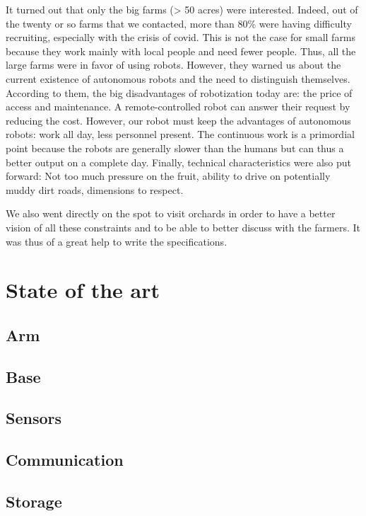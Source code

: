\documentclass[oneside]{book}
\begin{document}
It turned out that only the big farms (> 50 acres) were interested. Indeed, out of the twenty or so farms that we contacted, more than 80\% were having difficulty recruiting, especially with the crisis of covid. This is not the case for small farms because they work mainly with local people and need fewer people. Thus, all the large farms were in favor of using robots. However, they warned us about the current existence of autonomous robots and the need to distinguish themselves. According to them, the big disadvantages of robotization today are: the price of access and maintenance. A remote-controlled robot can answer their request by reducing the cost. However, our robot must keep the advantages of autonomous robots: work all day, less personnel present. The continuous work is a primordial point because the robots are generally slower than the humans but can thus a better output on a complete day. Finally, technical characteristics were also put forward: Not too much pressure on the fruit, ability to drive on potentially muddy dirt roads, dimensions to respect.

\bigbreak

We also went directly on the spot to visit orchards in order to have a better vision of all these constraints and to be able to better discuss with the farmers. It was thus of a great help to write the specifications. 

\section{State of the art}

\subsection{Arm}

\subsection{Base}

\subsection{Sensors}

\subsection{Communication}

\subsection{Storage}
\end{document}
